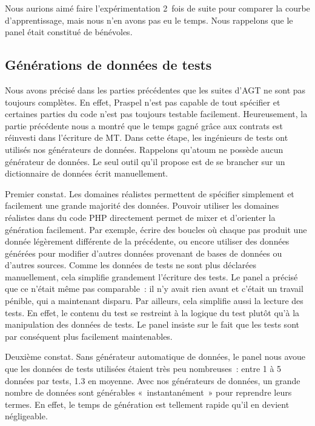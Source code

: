 Nous aurions aimé faire l'expérimentation 2~fois de suite pour comparer la
courbe d'apprentissage, mais nous n'en avons pas eu le temps. Nous rappelons que
le panel était constitué de bénévoles.

\subsection{Générations de données de tests}
%

Nous avons précisé dans les parties précédentes que les suites d'AGT ne sont pas
toujours complètes. En effet, Praspel n'est pas capable de tout spécifier et
certaines parties du code n'est pas toujours testable facilement. Heureusement,
la partie précédente nous a montré que le temps gagné grâce aux contrats est
réinvesti dans l'écriture de MT. Dans cette étape, les ingénieurs de tests ont
utilisés nos générateurs de données. Rappelons qu'atoum ne possède aucun
générateur de données. Le seul outil qu'il propose est de se brancher sur un
dictionnaire de données écrit manuellement.

Premier constat. Les domaines réalistes permettent de spécifier simplement et
facilement une grande majorité des données. Pouvoir utiliser les domaines
réalistes dans du code PHP directement permet de mixer et d'orienter la
génération facilement. Par exemple, écrire des boucles où chaque pas produit une
donnée légèrement différente de la précédente, ou encore utiliser des données
générées pour modifier d'autres données provenant de bases de données ou
d'autres sources. Comme les données de tests ne sont plus déclarées
manuellement, cela simplifie grandement l'écriture des tests. Le panel a précisé
que ce n'était même pas comparable~: il n'y avait rien avant et c'était un
travail pénible, qui a maintenant disparu. Par ailleurs, cela simplifie aussi la
lecture des tests. En effet, le contenu du test se restreint à la logique du
test plutôt qu'à la manipulation des données de tests. Le panel insiste sur le
fait que les tests sont par conséquent plus facilement maintenables.

Deuxième constat. Sans générateur automatique de données, le panel nous avoue
que les données de tests utilisées étaient très peu nombreuses~: entre 1 à 5
données par tests, 1.3 en moyenne. Avec nos générateurs de données, un grande
nombre de données sont générables «~instantanément~» pour reprendre leurs
termes. En effet, le temps de génération est tellement rapide qu'il en devient
négligeable.

